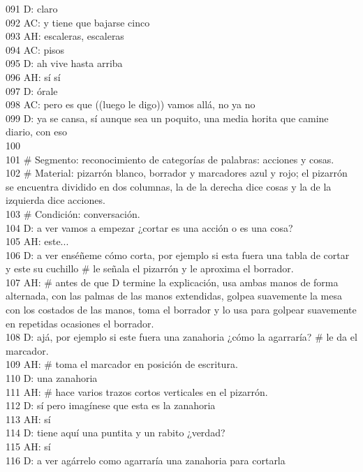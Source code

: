 091 D: claro\\
092 AC: y tiene que bajarse cinco\\
093 AH: escaleras, escaleras\\
094 AC: pisos\\
095 D: ah vive hasta arriba\\
096 AH: sí sí\\
097 D: órale\\
098 AC: pero es que ((luego le digo)) vamos allá, no ya no\\
099 D: ya se cansa, sí aunque sea un poquito, una media horita que camine diario, con eso\\
100 \\
101 \# Segmento: reconocimiento de categorías de palabras: acciones y cosas.\\
102 \# Material: pizarrón blanco, borrador y marcadores azul y rojo; el pizarrón se encuentra dividido en dos columnas, la de la derecha dice cosas y la de la izquierda dice acciones.\\
103 \# Condición: conversación.\\
104 D: a ver vamos a empezar ¿cortar es una acción o es una cosa?\\
105 AH: este...\\
106 D: a ver enséñeme cómo corta, por ejemplo si esta fuera una tabla de cortar y este su cuchillo \# le señala el pizarrón y le aproxima el borrador.\\
107 AH: \# antes de que D termine la explicación, usa ambas manos de forma alternada, con las palmas de las manos extendidas, golpea suavemente la mesa con los costados de las manos, toma el borrador y lo usa para golpear suavemente en repetidas ocasiones el borrador.\\
108 D: ajá, por ejemplo si este fuera una zanahoria ¿cómo la agarraría? \# le da el marcador.\\
109 AH: \# toma el marcador en posición de escritura.\\
110 D: una zanahoria\\
111 AH: \# hace varios trazos cortos verticales en el pizarrón.\\
112 D: sí pero imagínese que esta es la zanahoria\\
113 AH: sí\\
114 D: tiene aquí una puntita y un rabito ¿verdad?\\
115 AH: sí\\
116 D: a ver agárrelo como agarraría una zanahoria para cortarla\\
